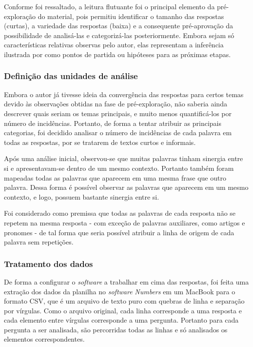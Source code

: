 Conforme foi ressaltado, a leitura flutuante foi o principal elemento da pré-exploração do material, pois permitiu identificar o tamanho das respostas (curtas), a variedade das respostas (baixa) e a consequente pré-aprovação da possibilidade de analisá-las e categorizá-las posteriormente. Embora sejam só características relativas observas pelo autor, elas representam a inferência ilustrada por  como pontos de partida ou hipóteses para as próximas etapas.

\subsubsection*{Definição das unidades de análise}

Embora o autor já tivesse ideia da convergência das respostas para certos temas devido às observações obtidas na fase de pré-exploração, não saberia ainda descrever quais seriam os temas principais, e muito menos quantificá-los por número de incidências. Portanto, de forma a tentar atribuir as principais categorias, foi decidido analisar o número de incidências de cada palavra em todas as respostas, por se tratarem de textos curtos e informais.

Após uma análise inicial, observou-se que muitas palavras tinham sinergia entre si e apresentavam-se dentro de um mesmo contexto. Portanto também foram mapeadas todas as palavras que aparecem em uma mesma frase que outro palavra. Dessa forma é possível observar as palavras que aparecem em um mesmo contexto, e logo, possuem bastante sinergia entre si.

Foi considerado como premissa que todas as palavras de cada resposta não se repetem na mesma resposta - com exceção de palavras auxiliares, como artigos e pronomes - de tal forma que seria possível atribuir a linha de origem de cada palavra sem repetições.

\subsubsection*{Tratamento dos dados}

De forma a configurar o \textit{software} a trabalhar em cima das respostas, foi feita uma extração dos dados da planilha no \textit{software} \textit{Numbers} em um MacBook para o formato CSV, que é um arquivo de texto puro com quebras de linha e separação por vírgulas. Como o arquivo original, cada linha corresponde a uma resposta e cada elemento entre vírgulas corresponde a uma pergunta. Portanto para cada pergunta a ser analisada, são percorridas todas as linhas e só analisados os elementos correspondentes.

